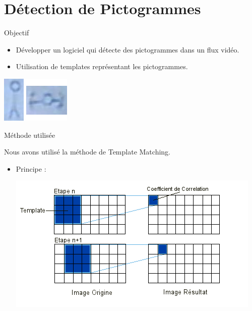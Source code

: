 \documentclass[t,14pt]{beamer}
\begin{document}
\section[Détection de Pictogrammes]{Détection de Pictogrammes}
\begin{frame}{Objectif}
\vspace{5mm}
\begin{block}{}
\begin{itemize}
\item Développer un logiciel qui détecte des pictogrammes dans un flux vidéo.
\item Utilisation de templates représentant les pictogrammes.
\end{itemize}
\end{block}
\begin{center}
\includegraphics[scale=0.66]{images/templates.png}
\end{center}
\end{frame}

\begin{frame}{Méthode utilisée}
\vspace{5mm}
\begin{block}{}
Nous avons utilisé la méthode de Template Matching.
\end{block}
\begin{itemize}
\item Principe : 
\begin{center}
\includegraphics[scale=0.66]{images/templateMatching.png}
\end{center}
\end{itemize}
\end{frame}
			
\end{document}
